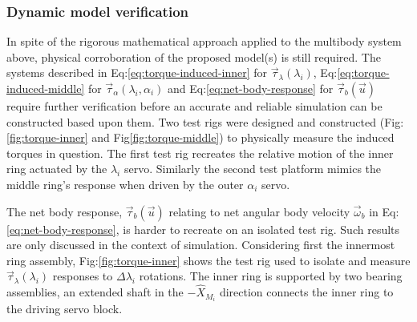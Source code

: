 \subsubsection{Dynamic model verification}
\label{subsubsec:dynamicmodel}
In spite of the rigorous mathematical approach applied to the multibody system above, physical corroboration of the proposed model(s) is still required. The systems described in Eq:\ref{eq:torque-induced-inner} for $\vec{\tau}_\lambda(\lambda_i)$, Eq:\ref{eq:torque-induced-middle} for $\vec{\tau}_\alpha(\lambda_i,\alpha_i)$ and Eq:\ref{eq:net-body-response} for $\vec{\tau}_b(\vec{u})$ require further verification before an accurate and reliable simulation can be constructed based upon them. Two test rigs were designed and constructed (Fig:\ref{fig:torque-inner} and Fig\ref{fig:torque-middle}) to physically measure the induced torques in question. The first test rig recreates the relative motion of the inner ring actuated by the $\lambda_i$ servo. Similarly the second test platform mimics the middle ring's response when driven by the outer $\alpha_i$ servo. 
\par
The net body response, $\vec{\tau}_b(\vec{u})$ relating to net angular body velocity $\vec{\omega}_b$ in Eq:\ref{eq:net-body-response}, is harder to recreate on an isolated test rig. Such results are only discussed in the context of simulation. Considering first the innermost ring assembly, Fig:\ref{fig:torque-inner} shows the test rig used to isolate and measure $\vec{\tau}_\lambda(\lambda_i)$ responses to $\Delta\lambda_i$ rotations. The inner ring is supported by two bearing assemblies, an extended shaft in the $-\hat{X}_{M_i}$ direction connects the inner ring to the driving servo block.
\par
